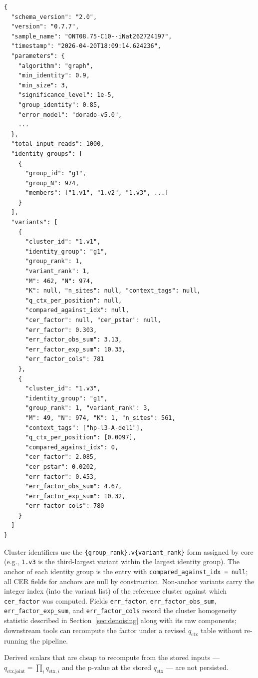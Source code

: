 \documentclass[11pt]{article}
\begin{document}
\begin{lstlisting}
{
  "schema_version": "2.0",
  "version": "0.7.7",
  "sample_name": "ONT08.75-C10--iNat262724197",
  "timestamp": "2026-04-20T18:09:14.624236",
  "parameters": {
    "algorithm": "graph",
    "min_identity": 0.9,
    "min_size": 3,
    "significance_level": 1e-5,
    "group_identity": 0.85,
    "error_model": "dorado-v5.0",
    ...
  },
  "total_input_reads": 1000,
  "identity_groups": [
    {
      "group_id": "g1",
      "group_N": 974,
      "members": ["1.v1", "1.v2", "1.v3", ...]
    }
  ],
  "variants": [
    {
      "cluster_id": "1.v1",
      "identity_group": "g1",
      "group_rank": 1,
      "variant_rank": 1,
      "M": 462, "N": 974,
      "K": null, "n_sites": null, "context_tags": null,
      "q_ctx_per_position": null,
      "compared_against_idx": null,
      "cer_factor": null, "cer_pstar": null,
      "err_factor": 0.303,
      "err_factor_obs_sum": 3.13,
      "err_factor_exp_sum": 10.33,
      "err_factor_cols": 781
    },
    {
      "cluster_id": "1.v3",
      "identity_group": "g1",
      "group_rank": 1, "variant_rank": 3,
      "M": 49, "N": 974, "K": 1, "n_sites": 561,
      "context_tags": ["hp-l3-A-del1"],
      "q_ctx_per_position": [0.0097],
      "compared_against_idx": 0,
      "cer_factor": 2.085,
      "cer_pstar": 0.0202,
      "err_factor": 0.453,
      "err_factor_obs_sum": 4.67,
      "err_factor_exp_sum": 10.32,
      "err_factor_cols": 780
    }
  ]
}
\end{lstlisting}

Cluster identifiers use the \texttt{\{group\_rank\}.v\{variant\_rank\}} form
assigned by core (e.g., \texttt{1.v3} is the third-largest variant within the
largest identity group). The anchor of each identity group is the entry with
\texttt{compared\_against\_idx = null}; all CER fields for anchors are null by
construction. Non-anchor variants carry the integer index (into the variant
list) of the reference cluster against which \texttt{cer\_factor} was computed.
Fields \texttt{err\_factor}, \texttt{err\_factor\_obs\_sum},
\texttt{err\_factor\_exp\_sum}, and \texttt{err\_factor\_cols} record the
cluster homogeneity statistic described in Section~\ref{sec:denoising} along
with its raw components; downstream tools can recompute the factor under a
revised $q_\text{ctx}$ table without re-running the pipeline.

Derived scalars that are cheap to recompute from the stored inputs ---
$q_\text{ctx,joint} = \prod_i q_{\text{ctx},i}$ and the p-value at the stored
$q_\text{ctx}$ --- are not persisted.
\end{document}
